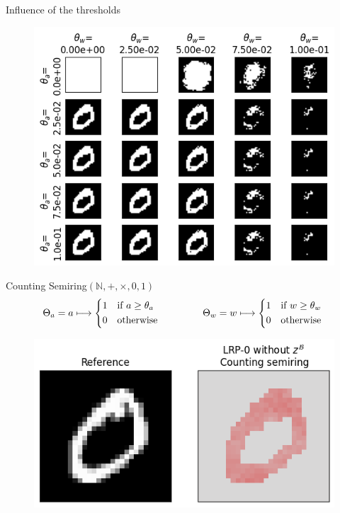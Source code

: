 \documentclass[aspectratio=169]{beamer}
\theoremstyle{definition}
\begin{document}
\begin{frame}{Influence of the thresholds}
    \begin{figure}
        \centering
        \includegraphics[width=.6\textwidth]{boolean-threshold.png}
    \end{figure}
\end{frame}

\begin{frame}{Counting Semiring}{\large $(\mathbb{N}, +, \times, 0, 1)$}
    \begin{equation*}
        \Theta_a = a \longmapsto \begin{cases*}
            1 & if $a\geq\theta_a$\\
            0 & otherwise
        \end{cases*}
        \qquad\qquad
        \Theta_w = w \longmapsto \begin{cases*}
            1 & if $w\geq\theta_w$\\
            0 & otherwise
        \end{cases*}
    \end{equation*}

    \begin{figure}[H]
        \centering
        \includegraphics[width=.5\textwidth]{counting.png}
    \end{figure}
\end{frame}

\end{document}

